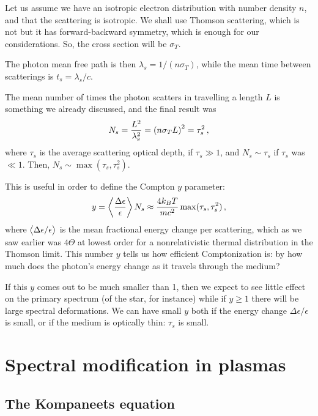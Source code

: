 \documentclass[main.tex]{subfiles}
\begin{document}
Let us assume we have an isotropic electron distribution with number density \(n\), and that the scattering is isotropic. We shall use Thomson scattering, which is not but it has forward-backward symmetry, which is enough for our considerations. So, the cross section will be \(\sigma _T\). 

The photon mean free path is then \(\lambda _s = 1 / (n \sigma _T)\), while the mean time between scatterings is \(t_s = \lambda _s / c\). 

The mean number of times the photon scatters in travelling a length \(L\) is something we already discussed, and the final result was 
%
\begin{align}
N_s = \frac{L^2}{\lambda _s^2} = \qty(n \sigma _T L)^2 = \tau _s^2
\,,
\end{align}
%
where \(\tau _s\) is the average scattering optical depth, if \(\tau _s \gg 1\), and \(N_s \sim \tau _s\) if \(\tau _s\) was \(\ll 1\). Then, \(N_s \sim \max (\tau _s, \tau _s^2)\). 

This is useful in order to define the Compton \(y\) parameter: 
%
\begin{align}
y = \expval{\frac{\Delta \epsilon }{\epsilon }} N_s \approx \frac{4 k_B T}{mc^2 } \max(\tau _s , \tau _s^2)
\,,
\end{align}
%
where \(\expval{\Delta \epsilon / \epsilon }\) is the mean fractional energy change per scattering, which as we saw earlier was \(4 \Theta \) at lowest order for a nonrelativistic thermal distribution in the Thomson  limit. 
This number \(y \) tells us how efficient Comptonization is: by how much does the photon's energy change as it travels through the medium?

If this \(y\) comes out to be much smaller than 1, then we expect to see little effect on the primary spectrum (of the star, for instance) while if \(y \geq 1\)  there will be large spectral deformations. 
We can have small \(y\) both if the energy change \(\Delta \epsilon / \epsilon \) is small, or if the medium is optically thin: \(\tau _s\) is small. 

\chapter{Spectral modification in plasmas}

\section{The Kompaneets equation}
\end{document}
